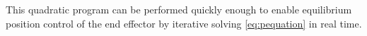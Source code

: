 This quadratic program can be performed quickly enough to enable equilibrium position control of the end effector by iterative solving \eqref{eq:pequation} in real time.

















































